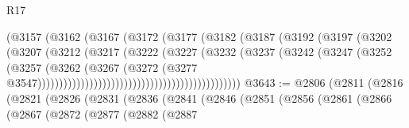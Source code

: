 \begin{lexlean}{R17}
\begin{coremodule}
{{{{{{{{{{{{{{{{{{{{{{{{{{{{{{{{{{{{{{{{{{{{{{{{{{{{{{{{{{{{{{{{{{{{{{{{{{{{{{{{{{{{{{{{{{{{{{{{{{{{{{{{{{{                                                (@3157
                                                  (@3162
                                                    (@3167
                                                      (@3172
                                                        (@3177
                                                          (@3182
                                                            (@3187
                                                              (@3192
                                                                (@3197
                                                                  (@3202
                                                                    (@3207
                                                                      (@3212
                                                                        (@3217
                                                                          (@3222
                                                                            (@3227
                                                                              (@3232
                                                                                (@3237
                                                                                  (@3242
                                                                                    (@3247
                                                                                      (@3252
                                                                                        (@3257
                                                                                          (@3262
                                                                                            (@3267
                                                                                              (@3272
                                                                                                (@3277
                                                                                                  @3547)))))))))))))))))))))))))))))))))))))))))))))))
@3643 := @2806
    (@2811
      (@2816
        (@2821
          (@2826
            (@2831
              (@2836
                (@2841
                  (@2846
                    (@2851
                      (@2856
                        (@2861
                          (@2866
                            (@2867
                              (@2872
                                (@2877
                                  (@2882
                                    (@2887
}}}}}}}}}}}}}}}}}}}}}}}}}}}}}}}}}}}}}}}}}}}}}}}}}}}}}}}}}}}}}}}}}}}}}}}}}}}}}}}}}}}}}}}}}}}}}}}}}}}}}}}}}}}
\end{coremodule}
\end{lexlean}

